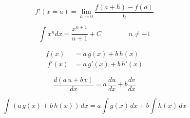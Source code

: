 \[\begin{equation} f'(x\!=\!a)=\lim_{h \to 0}\frac{f(a + h) - f(a)}{h} \end{equation}\]

\[\begin{equation} \int x^n dx = \frac{x^{n+1}}{n+1} + C \qquad\qquad n \neq -1 \end{equation}\]

\[\begin{align} f(x) &= a \, g(x) + b \, h(x) \\\ f'(x) &= a \, g'(x) + b \, h'(x) \end{align}\]

\[\begin{equation} \frac{d(a \, u+ b \, v)}{dx} = a \, \frac{du}{dx} +b\frac{dv}{dx} \end{equation}\]

\[\begin{equation} \int (a \, g(x) + b \, h(x))\, dx = a \int g(x) \, dx + b \int h(x) \, dx \end{equation}\]

